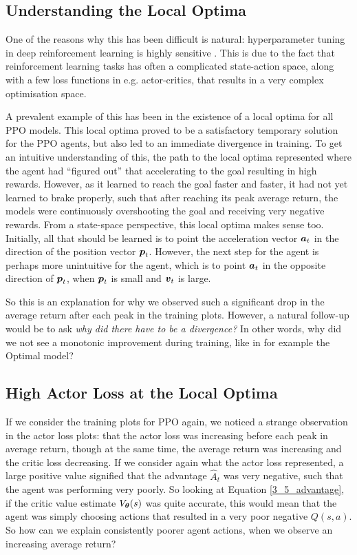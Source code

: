 \subsection{Understanding the Local Optima}
One of the reasons why this has been difficult is natural: hyperparameter tuning in deep reinforcement learning is highly sensitive \cite{selftuningAC}. This is due to the fact that reinforcement learning tasks has often a complicated state-action space, along with a few loss functions in e.g. actor-critics, that results in a very complex optimisation space. 

A prevalent example of this has been in the existence of a local optima for all PPO models. This local optima proved to be a satisfactory temporary solution for the PPO agents, but also led to an immediate divergence in training. To get an intuitive understanding of this, the path to the local optima represented where the agent had ``figured out'' that accelerating to the goal resulting in high rewards. However, as it learned to reach the goal faster and faster, it had not yet learned to brake properly, such that after reaching its peak average return, the models were continuously overshooting the goal and receiving very negative rewards. From a state-space perspective, this local optima makes sense too. Initially, all that should be learned is to point the acceleration vector ${\boldsymbol{a}}_t$ in the direction of the position vector ${\boldsymbol{p}}_t$. However, the next step for the agent is perhaps more unintuitive for the agent, which is to point ${\boldsymbol{a}}_t$ in the opposite direction of ${\boldsymbol{p}}_t$, when ${\boldsymbol{p}}_t$ is small and ${\boldsymbol{v}}_t$ is large. 

So this is an explanation for why we observed such a significant drop in the average return after each peak in the training plots. However, a natural follow-up would be to ask \textit{why did there have to be a divergence?} In other words, why did we not see a monotonic improvement during training, like in for example the Optimal model? 

\subsection{High Actor Loss at the Local Optima}
If we consider the training plots for PPO again, we noticed a strange observation in the actor loss plots: that the actor loss was increasing before each peak in average return, though at the same time, the average return was increasing and the critic loss decreasing. 
If we consider again what the actor loss represented, a large positive value signified that the advantage $\hat{A}_t$ was very negative, such that the agent was performing very poorly. So looking at Equation \eqref{3_5_advantage}, if the critic value estimate $V_{\boldsymbol{\theta}}(s)$ was quite accurate, this would mean that the agent was simply choosing actions that resulted in a very poor negative $Q(s,a)$. 
So how can we explain consistently poorer agent actions, when we observe an increasing average return? 

